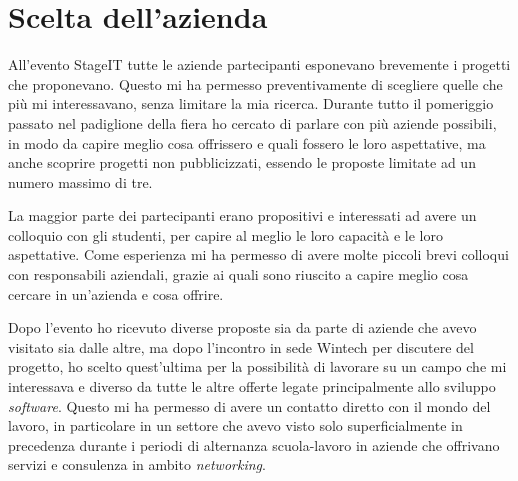 \section{Scelta dell'azienda}

All'evento StageIT tutte le aziende partecipanti esponevano brevemente i progetti che proponevano. Questo mi ha permesso preventivamente di scegliere quelle che più mi interessavano, senza limitare la mia ricerca. Durante tutto il pomeriggio passato nel padiglione della fiera ho cercato di parlare con più aziende possibili, in modo da capire meglio cosa offrissero e quali fossero le loro aspettative, ma anche scoprire progetti non pubblicizzati, essendo le proposte limitate ad un numero massimo di tre.

La maggior parte dei partecipanti erano propositivi e interessati ad avere un colloquio con gli studenti, per capire al meglio le loro capacità e le loro aspettative. Come esperienza mi ha permesso di avere molte piccoli brevi colloqui con responsabili aziendali, grazie ai quali sono riuscito a capire meglio cosa cercare in un'azienda e cosa offrire.

Dopo l'evento ho ricevuto diverse proposte sia da parte di aziende che avevo visitato sia dalle altre, ma dopo l'incontro in sede Wintech per discutere del progetto, ho scelto quest'ultima per la possibilità di lavorare su un campo che mi interessava e diverso da tutte le altre offerte legate principalmente allo sviluppo \textit{software}. Questo mi ha permesso di avere un contatto diretto con il mondo del lavoro, in particolare in un settore che avevo visto solo superficialmente in precedenza durante i periodi di alternanza scuola-lavoro in aziende che offrivano servizi e consulenza in ambito \textit{networking}.